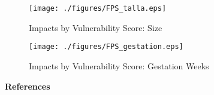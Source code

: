 \documentclass[10pt,letterpaper,subeqn,table]{beamer}
\begin{document}
\begin{frame}
\begin{figure}[htpb!]
  \begin{center}
  \centering
  \caption{Impacts by Vulnerability Score: Size}
  \texttt{[image: ./figures/FPS\_talla.eps]}
\end{center}
\end{figure}
\footnotesize{\hyperlink{FSP}{}}
\end{frame}

\begin{frame}
\begin{figure}[htpb!]
  \begin{center}
  \centering
  \caption{Impacts by Vulnerability Score: Gestation Weeks}
  \texttt{[image: ./figures/FPS\_gestation.eps]}
\end{center}
\end{figure}
\footnotesize{\hyperlink{FSP}{}}
\end{frame}



\begin{frame}[allowframebreaks]
  \textbf{References}
  
\end{frame}
\end{document}
